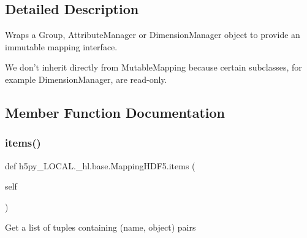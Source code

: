 \subsection{Detailed Description}
\begin{DoxyVerb}    Wraps a Group, AttributeManager or DimensionManager object to provide
    an immutable mapping interface.

    We don't inherit directly from MutableMapping because certain
    subclasses, for example DimensionManager, are read-only.
\end{DoxyVerb}
 

\subsection{Member Function Documentation}
\mbox{\label{classh5py__LOCAL_1_1__hl_1_1base_1_1MappingHDF5_a25a3af635780f6ee4b5e532b4cf31a44}} 
\subsubsection{\texorpdfstring{items()}{items()}\hspace{0.1cm}{\footnotesize\ttfamily [1/2]}}
{\footnotesize\ttfamily def h5py\+\_\+\+L\+O\+C\+A\+L.\+\_\+hl.\+base.\+Mapping\+H\+D\+F5.\+items (\begin{DoxyParamCaption}\item[{}]{self }\end{DoxyParamCaption})}

\begin{DoxyVerb}Get a list of tuples containing (name, object) pairs \end{DoxyVerb}
 \mbox{\label{classh5py__LOCAL_1_1__hl_1_1base_1_1MappingHDF5_a25a3af635780f6ee4b5e532b4cf31a44}} 
